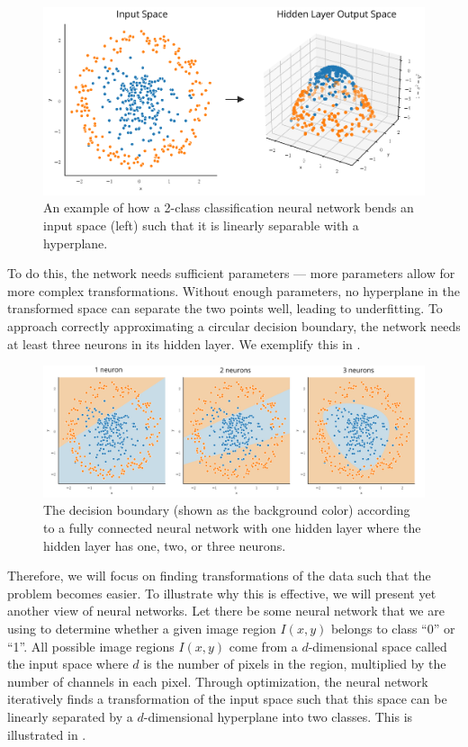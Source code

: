 	\begin{figure}[h]
		\centering
		\includegraphics[width=0.65\linewidth]{images/4/nn_trans_dataset}
		\caption{An example of how a 2-class classification neural network bends an input space (left) such that it is linearly separable with a hyperplane.}
		\label{fig:input-space-transform}
	\end{figure}

To do this, the network needs sufficient parameters --- more parameters allow for more complex transformations. Without enough parameters, no hyperplane in the transformed space can separate the two points well, leading to underfitting. To approach correctly approximating a circular decision boundary, the network needs at least three neurons in its hidden layer. We exemplify this in .

	\begin{figure}[h]
		\centering
		\includegraphics[width=\linewidth]{images/4/circular_dataset_neurons}
		\caption{The decision boundary (shown as the background color) according to a fully connected neural network with one hidden layer where the hidden layer has one, two, or three neurons.}
		\label{fig:circ-datataset-neurons}
	\end{figure}

Therefore, we will focus on finding transformations of the data such that the problem becomes easier. To illustrate why this is effective, we will present yet another view of neural networks. Let there be some neural network that we are using to determine whether a given image region $I(x, y)$ belongs to class ``0'' or ``1''. All possible image regions $I(x, y)$ come from a $d$-dimensional space called the input space where $d$ is the number of pixels in the region, multiplied by the number of channels in each pixel. Through optimization, the neural network iteratively finds a transformation of the input space such that this space can be linearly separated by a $d$-dimensional hyperplane into two classes. This is illustrated in .

